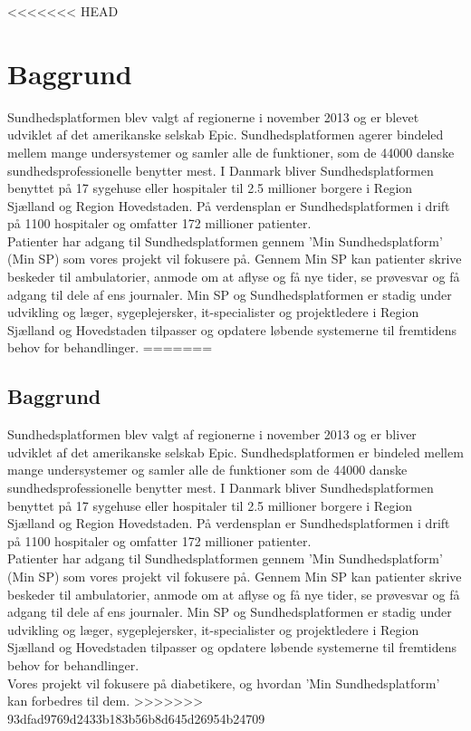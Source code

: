 <<<<<<< HEAD
\section{Baggrund}
Sundhedsplatformen blev valgt af regionerne i november 2013 og er blevet udviklet af det amerikanske selskab Epic. Sundhedsplatformen agerer bindeled mellem mange undersystemer og samler alle de funktioner, som de 44000 danske sundhedsprofessionelle benytter mest. I Danmark bliver Sundhedsplatformen benyttet på 17 sygehuse eller hospitaler til 2.5 millioner borgere i Region Sjælland og Region Hovedstaden. På verdensplan er Sundhedsplatformen i drift på 1100 hospitaler og omfatter 172 millioner patienter.\\
Patienter har adgang til Sundhedsplatformen gennem 'Min Sundhedsplatform' (Min SP) som vores projekt vil fokusere på. Gennem Min SP kan patienter skrive beskeder til ambulatorier, anmode om at aflyse og få nye tider, se prøvesvar og få adgang til dele af ens journaler. Min SP og Sundhedsplatformen er stadig under udvikling og læger, sygeplejersker, it-specialister og projektledere i Region Sjælland og Hovedstaden tilpasser og opdatere løbende systemerne til fremtidens behov for behandlinger.
=======
\subsection{Baggrund}
Sundhedsplatformen blev valgt af regionerne i november 2013 og er bliver udviklet af det amerikanske selskab Epic. Sundhedsplatformen er bindeled mellem mange undersystemer og samler alle de funktioner som de 44000 danske sundhedsprofessionelle benytter mest. I Danmark bliver Sundhedsplatformen benyttet på 17 sygehuse eller hospitaler til 2.5 millioner borgere i Region Sjælland og Region Hovedstaden. På verdensplan er Sundhedsplatformen i drift på 1100 hospitaler og omfatter 172 millioner patienter.\\
Patienter har adgang til Sundhedsplatformen gennem 'Min Sundhedsplatform' (Min SP) som vores projekt vil fokusere på. Gennem Min SP kan patienter skrive beskeder til ambulatorier, anmode om at aflyse og få nye tider, se prøvesvar og få adgang til dele af ens journaler. Min SP og Sundhedsplatformen er stadig under udvikling og læger, sygeplejersker, it-specialister og projektledere i Region Sjælland og Hovedstaden tilpasser og opdatere løbende systemerne til fremtidens behov for behandlinger.\\
Vores projekt vil fokusere på diabetikere, og hvordan 'Min Sundhedsplatform' kan forbedres til dem.
>>>>>>> 93dfad9769d2433b183b56b8d645d26954b24709
